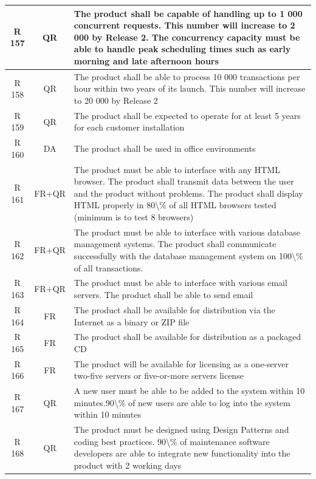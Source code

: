 \documentclass[dissertation,final]{softeng}
\begin{document}
\begin{appendices}
\begin{center}
\begin{longtable}{c c m{}}
    R 157   & QR & The product shall be capable of handling up to 1 000 concurrent requests. This number will increase to 2 000 by Release 2. The concurrency capacity must be able to handle peak scheduling times such as early morning and late afternoon hours \\    \midrule
    R 158   & QR & The product shall be able to process 10 000 transactions per hour within two years of its launch. This number will increase to 20 000 by Release 2 \\    \midrule
    R 159   & QR & The product shall be expected to operate for at least 5 years for each customer installation \\    \midrule
    R 160   & DA & The product shall be used in office environments \\    \midrule
    R 161   & FR+QR & The product must be able to interface with any HTML browser. The product shall transmit data between the user and the product without problems. The product shall display HTML properly in 80\textbackslash{}\% of all HTML browsers tested (minimum is to test 8 browsers) \\    \midrule
    R 162   & FR+QR & The product must be able to interface with various database management systems. The product shall communicate successfully with the database management system on 100\textbackslash{}\% of all transactions. \\    \midrule
    R 163   & FR+QR & The product must be able to interface with various email servers. The product shall be able to send email \\    \midrule
    R 164   & FR & The product shall be available for distribution via the Internet as a binary or ZIP file \\    \midrule
    R 165   & FR & The product shall be available for distribution as a packaged CD \\    \midrule
    R 166   & FR & The product will be available for licensing as a one-server two-five servers or five-or-more servers license \\    \midrule
    R 167   & QR & A new user must be able to be added to the system within 10 minutes.90\textbackslash{}\% of new users are able to log into the system within 10 minutes \\    \midrule
    R 168   & QR & The product must be designed using Design Patterns and coding best practices. 90\textbackslash{}\% of maintenance software developers are able to integrate new functionality into the product with 2 working days \\    \midrule

\end{longtable}
\end{center}
\end{appendices}
\end{document}
